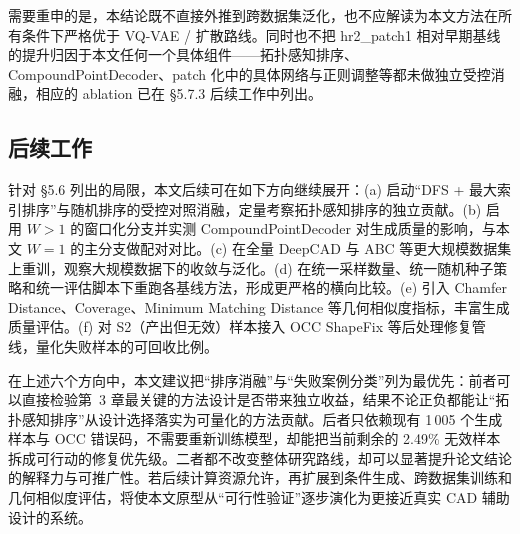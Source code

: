需要重申的是，本结论既不直接外推到跨数据集泛化，也不应解读为本文方法在所有条件下严格优于 VQ-VAE / 扩散路线。同时也不把 hr2\_patch1 相对早期基线的提升归因于本文任何一个具体组件——拓扑感知排序、CompoundPointDecoder、patch 化中的具体网络与正则调整等都未做独立受控消融，相应的 ablation 已在 §5.7.3 后续工作中列出。

\subsection{后续工作}

针对 §5.6 列出的局限，本文后续可在如下方向继续展开：(a) 启动“DFS + 最大索引排序”与随机排序的受控对照消融，定量考察拓扑感知排序的独立贡献。(b) 启用 $W > 1$ 的窗口化分支并实测 CompoundPointDecoder 对生成质量的影响，与本文 $W = 1$ 的主分支做配对对比。(c) 在全量 DeepCAD 与 ABC 等更大规模数据集上重训，观察大规模数据下的收敛与泛化。(d) 在统一采样数量、统一随机种子策略和统一评估脚本下重跑各基线方法，形成更严格的横向比较。(e) 引入 Chamfer Distance、Coverage、Minimum Matching Distance 等几何相似度指标，丰富生成质量评估。(f) 对 S2（产出但无效）样本接入 OCC ShapeFix 等后处理修复管线，量化失败样本的可回收比例。

在上述六个方向中，本文建议把“排序消融”与“失败案例分类”列为最优先：前者可以直接检验第~3 章最关键的方法设计是否带来独立收益，结果不论正负都能让“拓扑感知排序”从设计选择落实为可量化的方法贡献。后者只依赖现有 1\,005 个生成样本与 OCC 错误码，不需要重新训练模型，却能把当前剩余的 2.49\% 无效样本拆成可行动的修复优先级。二者都不改变整体研究路线，却可以显著提升论文结论的解释力与可推广性。若后续计算资源允许，再扩展到条件生成、跨数据集训练和几何相似度评估，将使本文原型从“可行性验证”逐步演化为更接近真实 CAD 辅助设计的系统。
